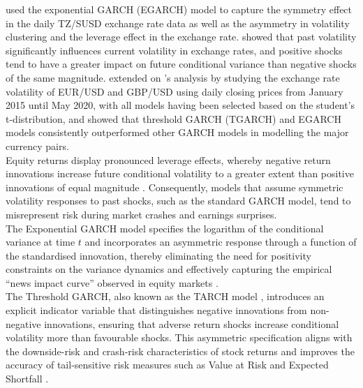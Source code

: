 \documentclass[oneside,12pt]{CUEDthesisPSnPDF}
\newcommand{\textcite}{\citet}
\newcommand{\parencite}{\citep}
\begin{document}
\textcite{epaphra2016modeling} used the exponential GARCH (EGARCH) model to capture the symmetry effect in the daily TZ/SUSD exchange rate data as well as the asymmetry in volatility clustering and the leverage effect in the exchange rate. \textcite{epaphra2016modeling} showed that past volatility significantly influences current volatility in exchange rates, and positive shocks tend to have a greater impact on future conditional variance than negative shocks of the same magnitude. \textcite{abdullah2020using} extended on \textcite{epaphra2016modeling}'s analysis by studying the exchange rate volatility of EUR/USD and GBP/USD using daily closing prices from January 2015 until May 2020, with all models having been selected based on the student's t-distribution, and showed that threshold GARCH (TGARCH) and EGARCH models consistently outperformed other GARCH models in modelling the major currency pairs. \\

Equity returns display pronounced leverage effects, whereby negative return innovations increase future conditional volatility to a greater extent than positive innovations of equal magnitude \parencite{black1976studies,christie1982stochastic,cont2001empirical}. Consequently, models that assume symmetric volatility responses to past shocks, such as the standard GARCH model, tend to misrepresent risk during market crashes and earnings surprises. \\

The Exponential GARCH model \parencite{nelson1991conditional} specifies the logarithm of the conditional variance at time $t$ and incorporates an asymmetric response through a function of the standardised innovation, thereby eliminating the need for positivity constraints on the variance dynamics and effectively capturing the empirical ``news impact curve'' observed in equity markets \parencite{engle1993measuring}. \\

The Threshold GARCH, also known as the TARCH model \parencite{zakoian1994threshold}, introduces an explicit indicator variable that distinguishes negative innovations from non-negative innovations, ensuring that adverse return shocks increase conditional volatility more than favourable shocks. This asymmetric specification aligns with the downside-risk and crash-risk characteristics of stock returns and improves the accuracy of tail-sensitive risk measures such as Value at Risk and Expected Shortfall \parencite{hansen1994autoregressive,bauwens2006multivariate}. \\
\end{document}
